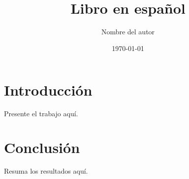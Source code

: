 \documentclass[11pt]{book}
\title{Libro en español}
\author{Nombre del autor}
\date{\today}
\begin{document}
\maketitle
\tableofcontents

\chapter{Introducción}
Presente el trabajo aquí.

\chapter{Conclusión}
Resuma los resultados aquí.
\end{document}

